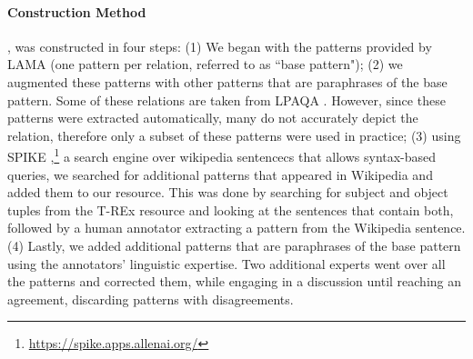 
\paragraph{Construction Method}
\resource{}, was constructed in four steps: (1) We began with the patterns provided by LAMA \cite{lama} (one pattern per relation, referred to as ``base pattern"); (2) we augmented these patterns with other patterns that are paraphrases of the base pattern. Some of these relations are
taken from LPAQA \cite{alpaqa}. However, since these patterns were extracted automatically, many do not accurately depict the relation, therefore only a subset of these patterns were used in practice;  (3) using SPIKE \cite{spike},\footnote{\url{https://spike.apps.allenai.org/}} a search engine over wikipedia sentencecs that allows syntax-based queries, we searched for additional patterns that appeared in Wikipedia and added them to our resource. This was done by searching for subject and object tuples from the T-REx resource and
looking at the sentences that contain both, followed by a human annotator extracting a pattern from the Wikipedia sentence. (4) Lastly, we added additional patterns that are paraphrases of the base pattern using the annotators' linguistic expertise.
Two additional experts went over all the patterns and corrected them, while engaging in a discussion until reaching an agreement, discarding patterns with disagreements.



